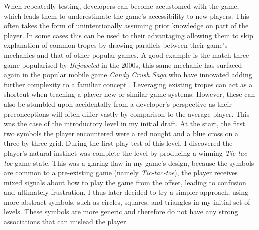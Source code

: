 \documentclass[final]{cmpreport}
\begin{document}
When repeatedly testing, developers can become accustomed with the game, which leads them to underestimate the game's accessibility to new players. This often takes the form of unintentionally assuming prior knowledge on part of the player. In some cases this can be used to their advantaging allowing them to skip explanation of common tropes by drawing parallels between their game's mechanics and that of other popular games. A good example is the match-three game popularised by \textit{Bejeweled} in the 2000s, this same mechanic has surfaced again in the popular mobile game \textit{Candy Crush Saga} who have innovated adding further complexity to a familiar concept \citep{Juul}. Leveraging existing tropes can act as a shortcut when teaching a player new or similar game systems. However, these can also be stumbled upon accidentally from a developer's perspective as their preconceptions will often differ vastly by comparison to the average player. This was the case of the introductory level in my initial draft. At the start, the first two symbols the player encountered were a red nought and a blue cross on a three-by-three grid. During the first play test of this level, I discovered the player's natural instinct was complete the level by producing a winning \emph{Tic-tac-toe} game state. This was a glaring flaw in my game's design, because the symbols are common to a pre-existing game (namely \emph{Tic-tac-toe}), the player receives mixed signals about how to play the game from the offset, leading to confusion and ultimately frustration. I thus later decided to try a simpler approach, using more abstract symbols, such as circles, squares, and triangles in my initial set of levels. These symbols are more generic and therefore do not have any strong associations that can mislead the player.
\end{document}
